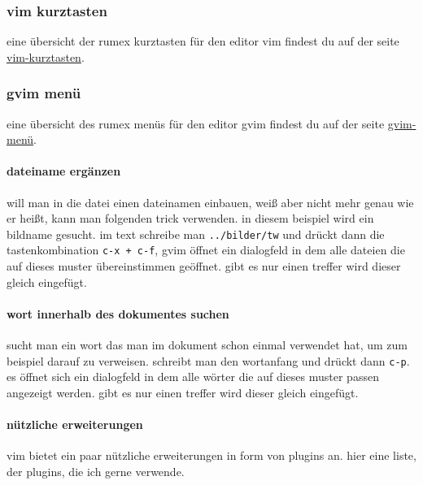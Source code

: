\subsubsection{vim kurztasten}\label{vim-kurztasten}

eine übersicht der rumex kurztasten für den editor vim findest du auf
der seite \href{vim-kurztasten.htm}{vim-kurztasten}.

\subsubsection{gvim menü}\label{gvim-menuxfc}

eine übersicht des rumex menüs für den editor gvim findest du auf der
seite \href{gvim-menue.htm}{gvim-menü}.

\paragraph{dateiname ergänzen}\label{dateiname-erguxe4nzen}

will man in die datei einen dateinamen einbauen, weiß aber nicht mehr
genau wie er heißt, kann man folgenden trick verwenden. in diesem
beispiel wird ein bildname gesucht. im text schreibe man
\texttt{../bilder/tw} und drückt dann die tastenkombination
\texttt{c-x + c-f}, gvim öffnet ein dialogfeld in dem alle dateien die
auf dieses muster übereinstimmen geöffnet. gibt es nur einen treffer
wird dieser gleich eingefügt.

\paragraph{wort innerhalb des dokumentes
suchen}\label{wort-innerhalb-des-dokumentes-suchen}

sucht man ein wort das man im dokument schon einmal verwendet hat, um
zum beispiel darauf zu verweisen. schreibt man den wortanfang und drückt
dann \texttt{c-p}. es öffnet sich ein dialogfeld in dem alle wörter die
auf dieses muster passen angezeigt werden. gibt es nur einen treffer
wird dieser gleich eingefügt.

\paragraph{nützliche erweiterungen}\label{nuxfctzliche-erweiterungen}

vim bietet ein paar nützliche erweiterungen in form von plugins an. hier
eine liste, der plugins, die ich gerne verwende.

